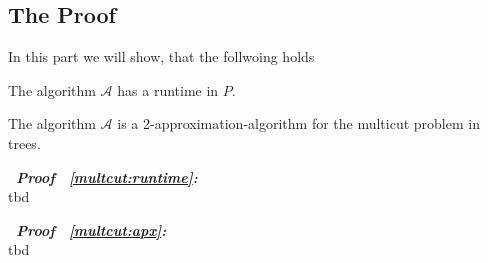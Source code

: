 \subsection*{The Proof}

In this part we will show, that the follwoing holds\\

\begin{lemma}\label{multcut:runtime}
The algorithm $\mathcal{A}$ has a runtime in $P$.
\end{lemma}
\begin{lemma}\label{multcut:apx}
The algorithm $\mathcal{A}$ is a 2-approximation-algorithm
for the multicut problem in trees.
\end{lemma}

\begin{description}
   \item{\bfseries\itshape~Proof ~\ref{multcut:runtime}:}\\
      tbd

   \item{\bfseries\itshape~Proof ~\ref{multcut:apx}:}\\
      tbd
\end{description}
